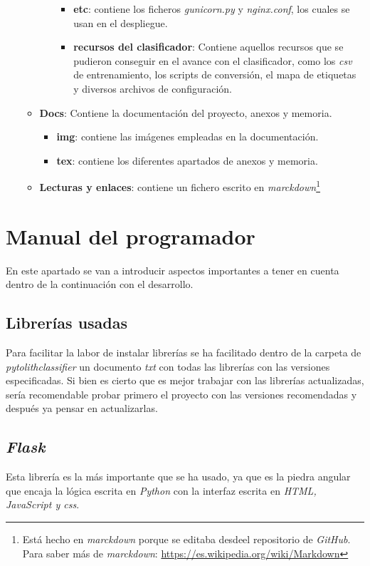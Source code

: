 \begin{itemize}
\begin{itemize}
\begin{itemize}
\begin{itemize}
					\item \textbf{etc}: contiene los ficheros \textit{gunicorn.py} y \textit{nginx.conf}, los cuales se usan en el despliegue.
					\item \textbf{recursos del clasificador}: Contiene aquellos recursos que se pudieron conseguir en el avance con el clasificador, como los \textit{csv} de entrenamiento, los scripts de conversión, el mapa de etiquetas y diversos archivos de configuración.
				\end{itemize}
			\end{itemize}
		\item \textbf{Docs}: Contiene la documentación del proyecto, anexos y memoria.
		\begin{itemize}
			\item \textbf{img}: contiene las imágenes empleadas en la documentación.
			\item \textbf{tex}: contiene los diferentes apartados de anexos y memoria.
		\end{itemize}
		\item \textbf{Lecturas y enlaces}: contiene un fichero escrito en \textit{marckdown}\footnote{Está hecho en \textit{marckdown} porque se editaba desdeel repositorio de \textit{GitHub}. Para saber más de \textit{marckdown}: \url{https://es.wikipedia.org/wiki/Markdown}}
	\end{itemize}
\end{itemize}
\section{Manual del programador}
En este apartado se van a introducir aspectos importantes a tener en cuenta dentro de la continuación con el desarrollo.

\subsection{Librerías usadas}
Para facilitar la labor de instalar librerías se ha facilitado dentro de la carpeta de \textit{pytolithclassifier} un documento \textit{txt} con todas las librerías con las versiones especificadas. Si bien es cierto que es mejor trabajar con las librerías actualizadas, sería recomendable probar primero el proyecto con las versiones recomendadas y después ya pensar en actualizarlas.

\subsection{\textit{Flask}}
Esta librería es la más importante que se ha usado, ya que es la piedra angular que encaja la lógica escrita en \textit{Python} con la interfaz escrita en \textit{HTML, JavaScript y css}.

